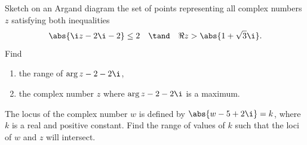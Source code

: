 \begin{problem}
    Sketch on an Argand diagram the set of points representing all complex numbers $z$ satisfying both inequalities \[\abs{\i z - 2\i - 2} \leq 2 \quad \tand \quad \Re{z} > \abs{1 + \sqrt3 \i}.\] Find
    \begin{enumerate}
        \item the range of $\arg{z - 2 - 2\i}$,
        \item the complex number $z$ where $\arg{z - 2 - 2\i}$ is a maximum.
    \end{enumerate}

    The locus of the complex number $w$ is defined by $\abs{w - 5 + 2\i} = k$, where $k$ is a real and positive constant. Find the range of values of $k$ such that the loci of $w$ and $z$ will intersect.
\end{problem}

